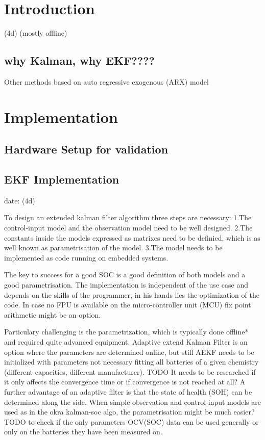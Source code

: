 
\chapter{Introduction}

(4d) (mostly offline)


\section{why Kalman, why EKF????}

Other methods based on  auto regressive exogenous (ARX) model


\chapter{Implementation}



\section{Hardware Setup for validation}

\section{EKF Implementation}
date: (4d)

To design an extended kalman filter algorithm three steps are necessary:
1.The control-input model and the observation model need to be well designed. 
2.The constants inside the models expressed as matrixes need to be definied, which is as well known as parametrisation of the model.  
3.The model needs to be implemented as code running on embedded systems. 

The key to success for a good SOC is a good definition of both models and a good parametrisation. The implementation is independent of the use case and depends on the skills of the programmer, in his  hands lies the optimization of the  code. In case no FPU is available on the micro-controller unit (MCU) fix point arithmetic might be an option.  

Particulary challenging is the parametrization, which is typically done offline* and required quite advanced equipment. Adaptive extend Kalman Filter is an option where the parameters are determined online, but still AEKF needs to be initialized with parameters not necessary fitting all batteries of a given chemistry (different capacities, different manufacturer). TODO It needs to be researched if it only affects the convergence time or if convergence is not reached at all?  A further advantage of an adaptive filter is that the state of health (SOH) can be determined along the side. 
When simple observation and control-input models are used as in the okra kalman-soc algo, the parametrisation might be much easier? TODO to check if the only parameters OCV(SOC) data can be used generally or only on the batteries they have been measured on. 


